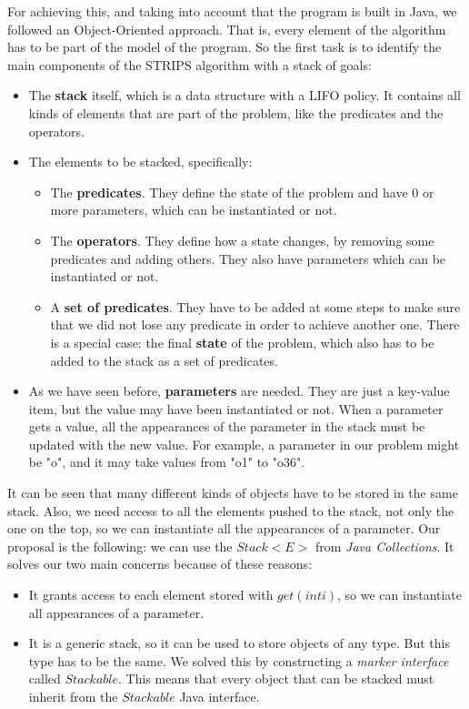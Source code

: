 \documentclass[12pt,a4paper,oneside]{article}
\numberwithin{equation}{section}
\numberwithin{equation}{section}
\theoremstyle{definition}
\begin{document}
For achieving this, and taking into account that the program is built in Java, we followed an Object-Oriented approach. That is, every element of the algorithm has to be part of the model of the program. So the first task is to identify the main components of the STRIPS algorithm with a stack of goals:

\begin{itemize}
	\item The \textbf{stack} itself, which is a data structure with a LIFO policy. It contains all kinds of elements that are part of the problem, like the predicates and the operators.
	\item The elements to be stacked, specifically:
	\begin{itemize}
		\item The \textbf{predicates}. They define the state of the problem and have 0 or more parameters, which can be instantiated or not.
		\item The \textbf{operators}. They define how a state changes, by removing some predicates and adding others. They also have parameters which can be instantiated or not.
		\item A \textbf{set of predicates}. They have to be added at some steps to make sure that we did not lose any predicate in order to achieve another one. There is a special case: the final \textbf{state} of the problem, which also has to be added to the stack as a set of predicates.
	\end{itemize}
	\item As we have seen before, \textbf{parameters} are needed. They are just a key-value item, but the value may have been instantiated or not. When a parameter gets a value, all the appearances of the parameter in the stack must be updated with the new value. For example, a parameter in our problem might be "o", and it may take values from "o1" to "o36".
\end{itemize}

It can be seen that many different kinds of objects have to be stored in the same stack. Also, we need access to all the elements pushed to the stack, not only the one on the top, so we can instantiate all the appearances of a parameter. Our proposal is the following: we can use the $Stack<E>$ from \textit{Java Collections}. It solves our two main concerns because of these reasons:

\begin{itemize}
	\item It grants access to each element stored with $get(int i)$, so we can instantiate all appearances of a parameter.
	\item It is a generic stack, so it can be used to store objects of any type. But this type has to be the same. We solved this by constructing a \textit{marker interface} called $Stackable$. This means that every object that can be stacked must inherit from the $Stackable$ Java interface.
\end{itemize}
\end{document}
